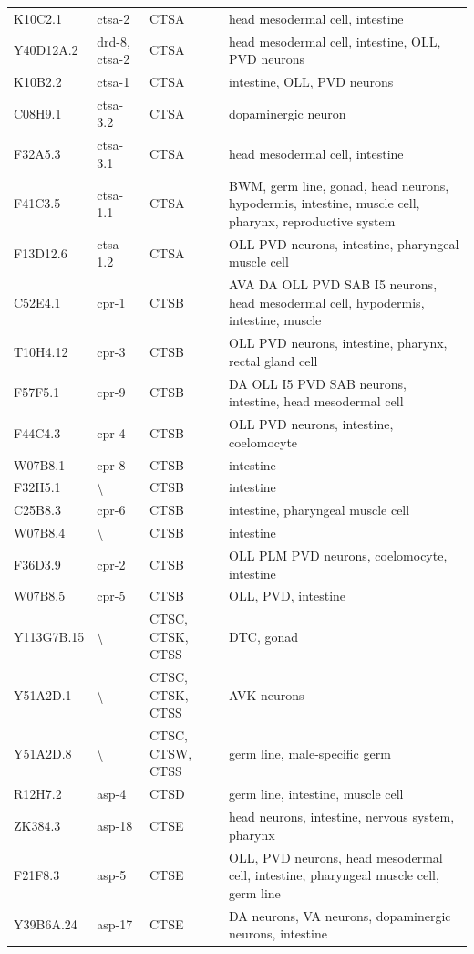 \begin{longtable}{lllp{7cm}}
K10C2.1 & ctsa-2 & CTSA & head mesodermal cell, intestine \\
Y40D12A.2 & drd-8, ctsa-2 & CTSA & head mesodermal cell, intestine, OLL, PVD neurons \\
K10B2.2 & ctsa-1 & CTSA & intestine, OLL, PVD neurons \\
C08H9.1 & ctsa-3.2 & CTSA & dopaminergic neuron \\
F32A5.3 & ctsa-3.1 & CTSA & head mesodermal cell, intestine \\
F41C3.5 & ctsa-1.1 & CTSA & BWM, germ line, gonad, head neurons, hypodermis, intestine, muscle cell, pharynx, reproductive system \\
F13D12.6 & ctsa-1.2 & CTSA & OLL PVD neurons, intestine, pharyngeal muscle cell \\
C52E4.1 & cpr-1 & CTSB & AVA DA OLL PVD SAB I5 neurons, head mesodermal cell, hypodermis, intestine, muscle \\
T10H4.12 & cpr-3 & CTSB & OLL PVD neurons, intestine, pharynx, rectal gland cell \\
F57F5.1 & cpr-9 & CTSB & DA OLL I5 PVD SAB neurons, intestine, head mesodermal cell \\
F44C4.3 & cpr-4 & CTSB & OLL PVD neurons, intestine, coelomocyte \\
W07B8.1 & cpr-8 & CTSB & intestine \\
F32H5.1 & \textbackslash & CTSB & intestine \\
C25B8.3 & cpr-6 & CTSB & intestine, pharyngeal muscle cell \\
W07B8.4 & \textbackslash & CTSB & intestine \\
F36D3.9 & cpr-2 & CTSB & OLL PLM PVD neurons, coelomocyte, intestine \\
W07B8.5 & cpr-5 & CTSB & OLL, PVD, intestine \\
Y113G7B.15 & \textbackslash & CTSC, CTSK, CTSS & DTC, gonad \\
Y51A2D.1 & \textbackslash & CTSC, CTSK, CTSS & AVK neurons \\
Y51A2D.8 & \textbackslash & CTSC, CTSW, CTSS & germ line, male-specific germ \\
R12H7.2 & asp-4 & CTSD & germ line, intestine, muscle cell \\
ZK384.3 & asp-18 & CTSE & head neurons, intestine, nervous system, pharynx \\
F21F8.3 & asp-5 & CTSE & OLL, PVD neurons, head mesodermal cell, intestine, pharyngeal muscle cell, germ line \\
Y39B6A.24 & asp-17 & CTSE & DA neurons, VA neurons, dopaminergic neurons, intestine \\

\end{longtable}
